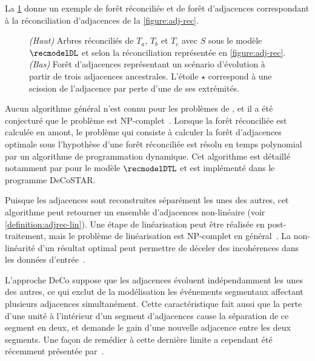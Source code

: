 La \cref{figure:adj-forest} donne un exemple de forêt réconciliée et de forêt d’adjacences correspondant à la réconciliation d’adjacences de la \cref{figure:adj-rec}.

\begin{figure}[htb]
    \capstart
    \centering
    
    \caption{
        \emph{(Haut)}
        Arbres réconciliés de \(T_a\), \(T_b\) et \(T_c\) avec \(S\)
        sous le modèle \(\recmodelDL\)
        et selon la réconciliation représentée en \cref{figure:adj-rec}.
        \emph{(Bas)}
        Forêt d’adjacences représentant un scénario d’évolution à partir de trois adjacences ancestrales.
        L’étoile \(\star\) correspond à une scission de l’adjacence par perte d’une de ses extrémités.
    }
    \label{figure:adj-forest}
\end{figure}

Aucun algorithme général n’est connu pour les problèmes de , et il a été conjecturé que le problème est NP-complet~\parencite{Boussau2020ReconcilingGeneTrees}.
Lorsque la forêt réconciliée est calculée en amont, le problème qui consiste à calculer la forêt d’adjacences optimale sous l’hypothèse d’une forêt réconciliée est résolu en temps polynomial par un algorithme de programmation dynamique.
Cet algorithme est détaillé notamment par \textcite{Duchemin2017DecostarReconstructingAncestral} pour le modèle \(\recmodelDTL\) et est implémenté dans le programme DeCoSTAR.

Puisque les adjacences sont reconstruites séparément les unes des autres, cet algorithme peut retourner un ensemble d’adjacences non-linéaire (voir \cref{definition:adjrec-lin}).
Une étape de linéarisation peut être réalisée en post-traitement, mais le problème de linéarisation est NP-complet en général~\parencite{Manuch2012LinearizationAncestralMultichromosomal}.
La non-linéarité d’un résultat optimal peut permettre de déceler des incohérences dans les données d’entrée~\parencite{Tannier2020AncestralGenomeOrganization}.

L’approche DeCo suppose que les adjacences évoluent indépendamment les unes des autres, ce qui exclut de la modélisation les événements segmentaux affectant plusieurs adjacences simultanément.
Cette caractéristique fait aussi que la perte d’une unité à l’intérieur d’un segment d’adjacences cause la séparation de ce segment en deux, et demande le gain d’une nouvelle adjacence entre les deux segments.
Une façon de remédier à cette dernière limite a cependant été récemment présentée par~\textcite{Tannier2020AncestralGenomeOrganization}.

